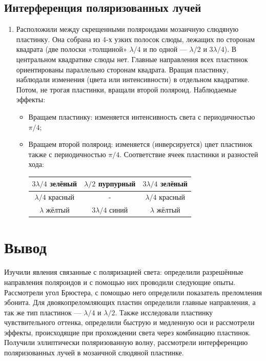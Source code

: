 \documentclass[a4paper,12pt]{article}
\begin{document}
	\subsection*{Интерференция поляризованных лучей}
	\begin{enumerate}
		\item Расположили между скрещенными поляроидами мозаичную слюдяную 	пластинку. Она собрана из 4-х узких полосок слюды, лежащих по сторонам квадрата (две полоски «толщиной» $\lambda/4$ и по одной --- $\lambda/2$ и $3\lambda/4$). В центральном квадратике слюды нет. Главные направления всех пластинок ориентированы параллельно сторонам квадрата. Вращая пластинку, наблюдали изменения (цвета или интенсивности) в отдельном квадратике. Потом, не трогая пластинки, вращали второй поляроид. Наблюдаемые эффекты:
		\begin{itemize}
		    \item Вращаем пластинку: изменяется интенсивность света с периодичностью $\pi/4$;
		    \item Вращаем второй поляроид: изменяется (инверсируется) цвет пластинок также с периодичностью  $\pi/4$. Соответствие ячеек пластинки и разностей хода:
		    \begin{center}
		        \begin{tabular}{ |c|c|c|}
		        \hline
		        $3\lambda/4$ зелёный & $\lambda/2$ пурпурный & $3\lambda/4$ зелёный\\
		        \hline
		        $\lambda/4$ красный & - & $\lambda/4$ красный \\
		        \hline
		        $\lambda$ жёлтый & $3\lambda/4$ синий & $\lambda$ жёлтый \\
		        \hline
		        \end{tabular}
		    \end{center}
		\end{itemize}
	\end{enumerate}
	
\section*{Вывод}
Изучили явления связанные с поляризацией света: определили разрешённые направления поляроидов и с помощью них проводили следующие опыты. Рассмотрели угол Брюстера, с помощью него определили показатель преломления эбонита. Для двоякопреломляющих пластин определили главные направления, а так же тип пластинок --- $\lambda /4$ и $\lambda/2$. Также исследовали пластинку чувствительного оттенка, определили быструю и медленную оси и рассмотрели эффекты, происходящие при прохождении света через комбинацию пластинок. Получили эллиптически поляризованную волну, рассмотрели интерференцию поляризованных лучей в мозаичной слюдяной пластинке.
	
\end{document}
